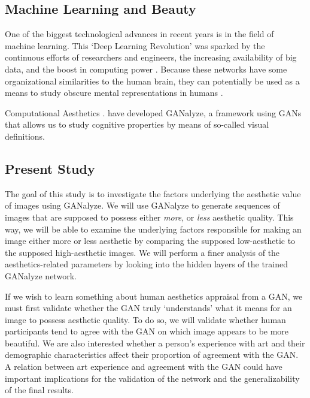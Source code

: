 \documentclass[../main.tex]{subfiles}
\begin{document}
\subsection{Machine Learning and Beauty}
One of the biggest technological advances in recent years is in the field of machine learning. This `Deep Learning Revolution' was sparked by the continuous efforts of researchers and engineers, the increasing availability of big data, and the boost in computing power \parencite{sejnowskiDeepLearningRevolution2018}. Because these networks have some organizational similarities to the human brain, they can potentially be used as a means to study obscure mental representations in humans \parencite{guoDeepLearningVisual2016}.

Computational Aesthetics \parencite{valenziseAdvancesChallengesComputational2022}.
\textcite{goetschalckxGANalyzeVisualDefinitions2019} have developed GANalyze, a framework using GANs that allows us to study cognitive properties by means of so-called visual definitions.


\subsection{Present Study}
The goal of this study is to investigate the factors underlying the aesthetic value of images using GANalyze. We will use GANalyze to generate sequences of images that are supposed to possess either \textit{more}, or \textit{less} aesthetic quality. This way, we will be able to examine the underlying factors responsible for making an image either more or less aesthetic by comparing the supposed low-aesthetic to the supposed high-aesthetic images. We will perform a finer analysis of the aesthetics-related parameters by looking into the hidden layers of the trained GANalyze network.

If we wish to learn something about human aesthetics appraisal from a GAN, we must first validate whether the GAN truly `understands' what it means for an image to possess aesthetic quality. To do so, we will validate whether human participants tend to agree with the GAN on which image appears to be more beautiful. We are also interested whether a person's experience with art and their demographic characteristics affect their proportion of agreement with the GAN. A relation between art experience and agreement with the GAN could have important implications for the validation of the network and the generalizability of the final results.
\end{document}
